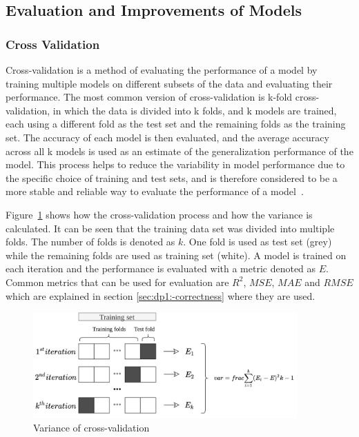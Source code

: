 \subsection{Evaluation and Improvements of Models}\label{subsec:evaluations-and-improvements-of-models}

\subsubsection{Cross Validation}\label{subsubsec:cross-validation}
Cross-validation is a method of evaluating the performance of a model by training
multiple models on different subsets of the data and evaluating their performance.
The most common version of cross-validation is k-fold cross-validation, in which the data is divided into k folds,
and k models are trained, each using a different fold as the test set and the remaining folds as the training set.
The accuracy of each model is then evaluated, and the average accuracy across all k
models is used as an estimate of the generalization performance of the model.
This process helps to reduce the variability in model performance due to the specific choice of training and test
sets, and is therefore considered to be a more stable and reliable way to evaluate the performance of a
model~\cite[p. 252--260]{muller_introductionmachinelearning_2016}.

Figure~\ref{fig:cross-validation} shows how the cross-validation process and how the variance
is calculated.
It can be seen that the training data set was divided into multiple folds.
The number of folds is denoted as $k$.
One fold is used as test set (grey) while the remaining folds are used as training set (white).
A model is trained on each iteration and the performance is evaluated with a metric denoted as $E$.
Common metrics that can be used for evaluation are $R^2$, $MSE$, $MAE$ and $RMSE$ which are explained in section
\ref{sec:dp1:-correctness} where they are used.

\begin{figure}[h]
    \begin{tcolorbox}[arc=0pt,boxrule=0.5pt]
        \centering
        \includegraphics[trim=left botm right top, width=0.9\textwidth]
        {chap2/images/cross_validation}
        \caption{Variance of cross-validation}
        \label{fig:cross-validation}
    \end{tcolorbox}
\end{figure}

